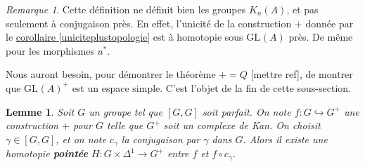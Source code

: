\documentclass{amsart}
\newcommand{\sref}[2]{\hyperref[#2]{#1 \ref*{#2}}}
\theoremstyle{plain}
\newtheorem{lem}[theo]{Lemme}
\theoremstyle{definition}
\theoremstyle{remark}
\newtheorem{rem}[theo]{Remarque}
\newcommand{\GL}[2]{\mathrm{GL}_{#1}(#2)}
\newcommand{\ra}{\rightarrow}
\begin{document}
\begin{rem}
  Cette définition ne définit bien les groupes $K_n(A)$, et pas seulement à conjugaison près. En effet, l'unicité de la construction $+$ donnée par le
  \sref{corollaire}{uniciteplustopologie} est à homotopie sous $\GL{}{A}$ près. De même pour les morphismes $u^*$.
\end{rem}

Nous auront besoin, pour démontrer le théorème $+=Q$ [mettre ref], de montrer que $\GL{}{A}^+$ est un espace simple.
C'est l'objet de la fin de cette sous-section.

\begin{lem}\label{lemmeplussimple}
  Soit $G$ un groupe tel que $[G,G]$ soit parfait. On note $f:G\hookrightarrow G^+$ une construction $+$ pour $G$ telle que
  $G^+$ soit un complexe de Kan. On choisit $\gamma\in [G,G]$, et on note $c_\gamma$ la conjugaison par $\gamma$ dans $G$.
  Alors il existe une homotopie \textbf{pointée} $H:G\times\Delta^1\ra G^+$ entre $f$ et $f\circ c_\gamma$.
\end{lem}
\end{document}
